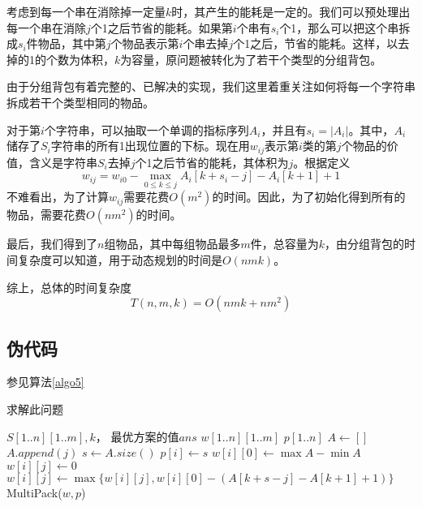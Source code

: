 \documentclass[UTF8]{ctexart}
\begin{document}
        考虑到每一个串在消除掉一定量$k$时，其产生的能耗是一定的。我们可以预处理出每一个串在消除$j$个1之后节省的能耗。如果第$i$个串有$s_i$个1，那么可以把这个串拆成$s_i$件物品，其中第$j$个物品表示第$i$个串去掉$j$个1之后，节省的能耗。这样，以去掉的1的个数为体积，$k$为容量，原问题被转化为了若干个类型的分组背包。

        由于分组背包有着完整的、已解决的实现，我们这里着重关注如何将每一个字符串拆成若干个类型相同的物品。

        对于第$i$个字符串，可以抽取一个单调的指标序列$A_i$，并且有$s_i = |A_i|$。其中，$A_i$储存了$S_i$字符串的所有1出现位置的下标。现在用$w_{ij}$表示第$i$类的第$j$个物品的价值，含义是字符串$S_i$去掉$j$个1之后节省的能耗，其体积为$j$。根据定义
        $$w_{ij} = w_{i0} - \max_{0 \leq k \leq j}{A_i[k+s_i-j]-A_i[k+1]+1}$$
        不难看出，为了计算$w_{ij}$需要花费$O(m^2)$的时间。因此，为了初始化得到所有的物品，需要花费$O(nm^2)$的时间。

        最后，我们得到了$n$组物品，其中每组物品最多$m$件，总容量为$k$，由分组背包的时间复杂度可以知道，用于动态规划的时间是$O(nmk)$。

        综上，总体的时间复杂度
        $$T(n, m, k) = O(nmk+nm^2)$$

    \subsection*{伪代码}
    参见算法\ref{algo5}
    \begin{algorithm}
        \caption{求解此问题}
        \begin{algorithmic}[1]
            \Require $S[1..n][1..m], k$，
            \Ensure 最优方案的值$ans$
                \State $w[1..n][1..m]$
                \State $p[1..n]$
                    \State $A\gets []$
                            \State $A.append(j)$
                        \EndIf
                    \EndFor
                    \State $s\gets A.size()$
                    \State $p[i]\gets s$
                    \State $w[i][0] \gets \max{A}-\min{A}$
                        \State $w[i][j] \gets 0$
                            \State $w[i][j] \gets \max{\{w[i][j], w[i][0]-(A[k+s-j]-A[k+1]+1)\}}$
                        \EndFor
                    \EndFor
                \EndFor
                \State \Return MultiPack($w, p$)
            \EndFunction
        \end{algorithmic}
        \label{algo5}
    \end{algorithm}
\end{document}
